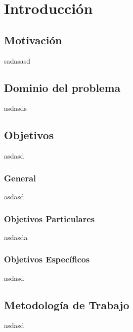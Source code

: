 
\chapter{Introducción} %

\label{Chapter1} %


\section{Motivación}
sadasasd
\section{Dominio del problema}
asdasds
\section{Objetivos}
asdasd
\subsection{General}
asdasd

\subsection{Objetivos Particulares}
asdasda

\subsection{Objetivos Específicos}
asdasd

\section{Metodología de Trabajo}
asdasd
